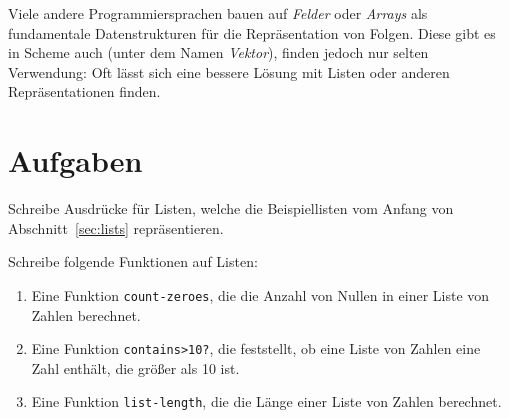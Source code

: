 Viele andere Programmiersprachen bauen auf \textit{Felder} oder
\textit{Arrays} als fundamentale Datenstrukturen für die
Repräsentation von Folgen.  Diese gibt es in
Scheme auch (unter dem Namen \textit{Vektor}), finden jedoch
nur selten Verwendung: Oft lässt sich eine
bessere Lösung mit Listen oder anderen Repräsentationen finden.

\section*{Aufgaben}

\begin{aufgabe}
  Schreibe Ausdrücke für Listen, welche die Beispiellisten vom
  Anfang von Abschnitt~\ref{sec:lists} repräsentieren.
\end{aufgabe}

\begin{aufgabe}
Schreibe folgende Funktionen auf Listen:
  
  \begin{enumerate} 
    
  \item Eine Funktion \texttt{count-zeroes}, die die Anzahl von Nullen
    in einer Liste von Zahlen berechnet.
    
  \item Eine Funktion \texttt{contains>10?}, die feststellt, ob eine
    Liste von Zahlen eine Zahl enthält, die größer als 10 ist.
    
  \item Eine Funktion \texttt{list-length}, die die Länge einer Liste
    von Zahlen berechnet.

  \end{enumerate}
  
\end{aufgabe}

